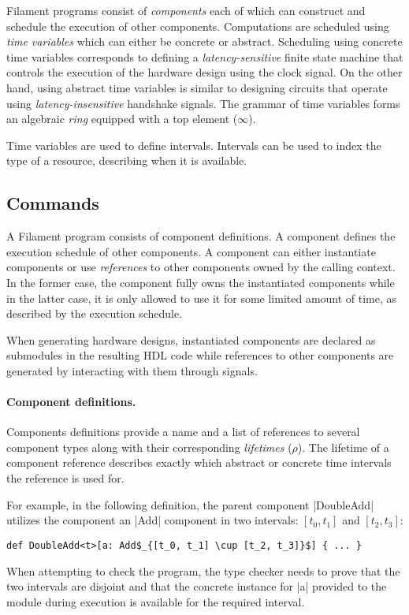 \documentclass[acmsmall,review,anonymous]{acmart}
\begin{document}
Filament programs consist of \emph{components} each of which can construct and schedule the execution of other components.
Computations are scheduled using \emph{time variables} which can either be concrete or abstract.
%
%
Scheduling using concrete time variables corresponds to defining a \emph{latency-sensitive} finite state machine that controls the execution of the hardware design using the clock signal.
On the other hand, using abstract time variables is similar to designing circuits that operate using \emph{latency-insensitive} handshake signals.
The grammar of time variables forms an algebraic \emph{ring} equipped with a top element ($\infty$).

Time variables are used to define intervals.
Intervals can be used to index the type of a resource, describing when it is available.

\subsection{Commands}

A Filament program consists of component definitions.
A component defines the execution schedule of other components.
A component can either instantiate components or use \emph{references} to other components
owned by the calling context.
In the former case, the component fully owns the instantiated components while
in the latter case, it is only allowed to use it for some limited amount of
time, as described by the execution schedule.

When generating hardware designs, instantiated components are declared as
submodules in the resulting HDL code while references to other components are
generated by interacting with them through signals.


\paragraph{Component definitions.}
Components definitions provide a name and a list of references to several
component types along with their corresponding \emph{lifetimes} ($\rho$).
The lifetime of a component reference describes exactly which abstract or concrete
time intervals the reference is used for.

For example, in the following definition, the parent component \code|DoubleAdd| utilizes
the component an \code|Add| component in two intervals: $[t_0, t_1]$ and $[t_2, t_3]$:
%
\begin{lstlisting}
def DoubleAdd<t>[a: Add$_{[t_0, t_1] \cup [t_2, t_3]}$] { ... }
\end{lstlisting}
%
When attempting to check the program, the type checker needs to prove that the
two intervals are disjoint and that the concrete instance for \code|a| provided
to the module during execution is available for the required interval.
\end{document}
